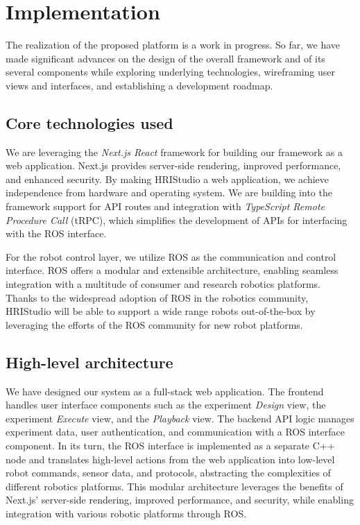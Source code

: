 \documentclass[letterpaper, 10 pt, conference]{ieeeconf}
\begin{document}
\section{Implementation}

The realization of the proposed platform is a work in progress. So far, we have made significant advances on the design of the overall framework and of its several components while exploring underlying technologies, wireframing user views and interfaces, and establishing a development roadmap.

\subsection{Core technologies used}

We are leveraging the \emph{Next.js React} \cite{next} framework for building our framework as a web application. Next.js provides server-side rendering, improved performance, and enhanced security. By making HRIStudio a web application, we achieve independence from hardware and operating system. We are building into the framework support for API routes and integration with \emph{TypeScript Remote Procedure Call} (tRPC), which simplifies the development of APIs for interfacing with the ROS interface.

For the robot control layer, we utilize ROS as the communication and control interface. ROS offers a modular and extensible architecture, enabling seamless integration with a multitude of consumer and research robotics platforms. Thanks to the widespread adoption of ROS in the robotics community, HRIStudio will be able to support a wide range robots out-of-the-box by leveraging the  efforts of the ROS community for new robot platforms.

\subsection{High-level architecture}

We have designed our system as a full-stack web application.  The frontend handles user interface components such as the experiment \emph{Design} view, the experiment \emph{Execute} view, and the \emph{Playback} view. The backend API logic manages experiment data, user authentication, and communication with a ROS interface component. In its turn, the ROS interface is implemented as a separate C++ node and translates high-level actions from the web application into low-level robot commands, sensor data, and protocols, abstracting the complexities of different robotics platforms. This modular architecture leverages the benefits of Next.js' server-side rendering, improved performance, and security, while enabling integration with various robotic platforms through ROS.
\end{document}
